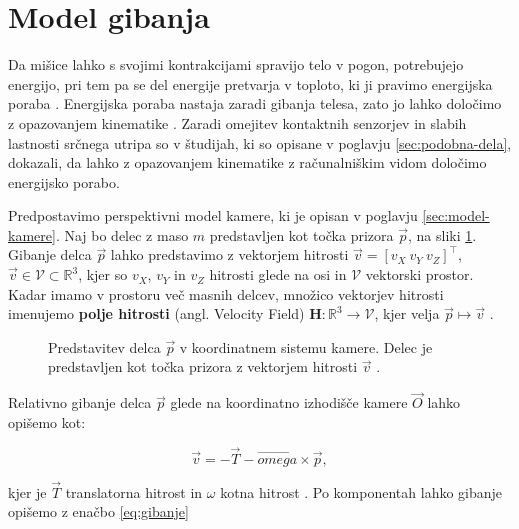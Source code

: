 \section{Model gibanja}\label{sec:model-gibanja}
Da mišice lahko s svojimi kontrakcijami spravijo telo v pogon, potrebujejo energijo, pri tem pa se del energije pretvarja v toploto, ki ji pravimo energijska poraba \cite{scott2005misconceptions}. Energijska poraba nastaja zaradi gibanja telesa, zato jo lahko določimo z opazovanjem kinematike \cite{levine2005measurement}. Zaradi omejitev kontaktnih senzorjev in slabih lastnosti srčnega utripa so v študijah, ki so opisane v poglavju \ref{sec:podobna-dela}, dokazali, da lahko z opazovanjem kinematike z računalniškim vidom določimo energijsko porabo. 

Predpostavimo perspektivni model kamere, ki je opisan v poglavju \ref{sec:model-kamere}.
Naj bo delec z maso $m$ predstavljen kot točka prizora $\vec{p}$, na sliki \ref{fig:model-gibanja}. Gibanje delca $\vec{p}$ lahko predstavimo z vektorjem hitrosti $\vec{v} = [v_X~v_Y~v_Z]^\top$, $\vec{v} \in \mathcal{V} \subset \mathbb{R}^3$, kjer so $v_X$, $v_Y$ in $v_Z$ hitrosti glede na osi in $\mathcal{V}$ vektorski prostor. Kadar imamo v prostoru več masnih delcev, množico vektorjev hitrosti imenujemo \textbf{polje hitrosti} (angl. Velocity Field) $\mathbf{H}: \mathbb{R}^3 \to \mathcal{V}$, kjer velja $\vec{p} \mapsto \vec{v}$ \cite{trucco1998introductory}.


\begin{figure}[htb]
\centering

\caption[Predstavitev delca $\vec{p}$ v koordinatnem sistemu kamere]{Predstavitev delca $\vec{p}$ v koordinatnem sistemu kamere. Delec je predstavljen kot točka prizora z vektorjem hitrosti $\vec{v}$ \cite{trucco1998introductory}.}
\label{fig:model-gibanja}
\end{figure}



Relativno gibanje delca $\vec{p}$ glede na koordinatno izhodišče kamere $\vec{O}$ lahko opišemo kot:

\begin{equation}
	\vec{v} = -\vec{T}-\vec{omega}\times\vec{p},
\end{equation}

kjer je $\vec{T}$ translatorna hitrost in $\omega$ kotna hitrost \cite{trucco1998introductory}. Po komponentah lahko gibanje opišemo z enačbo \eqref{eq:gibanje}


